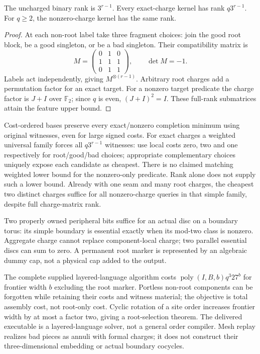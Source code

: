 \begin{proposition}
The uncharged binary rank is $3^{r-1}$. Every exact-charge kernel has rank
$q3^{r-1}$. For $q\ge2$, the nonzero-charge kernel has the same rank.
\end{proposition}
\begin{proof}
At each non-root label take three fragment choices: join the good root
block, be a good singleton, or be a bad singleton. Their compatibility matrix is
\[
 M=\begin{pmatrix}0&1&0\\1&1&1\\0&1&1\end{pmatrix},\qquad\det M=-1.
\]
Labels act independently, giving $M^{\otimes(r-1)}$. Arbitrary root charges
add a permutation factor for an exact target. For a nonzero target predicate
the charge factor is $J+I$ over $\mathbb F_2$; since $q$ is even,
$(J+I)^2=I$. These full-rank submatrices attain the feature upper bound.
\end{proof}

Cost-ordered bases preserve every exact/nonzero completion minimum using
original witnesses, even for large signed costs. For exact charges a
weighted universal family forces all $q3^{r-1}$ witnesses: use local costs
zero, two and one respectively for root/good/bad choices; appropriate
complementary choices uniquely expose each candidate as cheapest. There is
no claimed matching weighted lower bound for the nonzero-only predicate.
Rank alone does not supply such a lower bound. Already with one seam and
many root charges, the cheapest two distinct charges suffice for all
nonzero-charge queries in that simple family, despite full charge-matrix rank.

Two properly owned peripheral bits suffice for an actual disc on a boundary
torus: its simple boundary is essential exactly when its mod-two class is
nonzero. Aggregate charge cannot replace component-local charge; two parallel
essential discs can sum to zero. A permanent root marker is represented by
an algebraic dummy cap, not a physical cap added to the output.

The complete supplied layered-language algorithm costs
$\operatorname{poly}(I,B,b)q^3 27^b$ for frontier width $b$ excluding the
root marker. Portless non-root components can be forgotten while retaining
their costs and witness material; the objective is total assembly cost,
not root-only cost. Cyclic rotation of a site order increases frontier width
by at most a factor two, giving a root-selection theorem. The delivered
executable is a layered-language solver, not a general order compiler.
Mesh replay realizes bad pieces as annuli with formal charges; it does not
construct their three-dimensional embedding or actual boundary cocycles.

